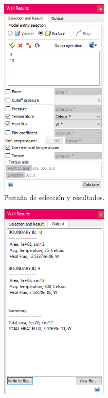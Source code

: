 \begin{enumerate}
\begin{figure}[H]
\begin{subfigure}[b]{0.48\textwidth}
			\includegraphics[width=0.6\textwidth]{figuras/Procedimiento_Simulaciones/Conduccion/ventana_wall_calculator.png}
			\caption{Pestaña de selección y resultados.}
			\label{fig:ventana_wall_calculator_control}
		\end{subfigure}
	  \hfill
		\begin{subfigure}[b]{0.48\textwidth}
			\centering
			\includegraphics[width=0.6\textwidth]{figuras/Procedimiento_Simulaciones/Conduccion/resultados_conduccion.png}

\end{subfigure}
\end{figure}
\end{enumerate}
